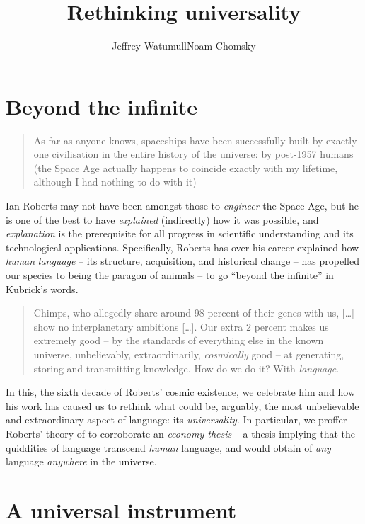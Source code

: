 \documentclass[output=paper]{langsci/langscibook}
\author{Jeffrey Watumull\affiliation{Oceanit}\lastand Noam Chomsky\affiliation{University of Arizona, Massachusetts Institute of Technology}}
\title{Rethinking universality}
\begin{document}
\glsresetall

\section{Beyond the infinite}%

\begin{quote}
As far as anyone knows, spaceships have been successfully built by exactly one
civilisation in the entire history of the universe: by post-1957 humans (the
Space Age actually happens to coincide exactly with my lifetime, although I had
nothing to do with it) \hfill \hbox{\citep[1]{Roberts2017}}
\end{quote}

Ian Roberts may not have been amongst those to \emph{engineer} the Space Age, but he is one of the best to
have \emph{explained} (indirectly) how it was possible, and \emph{explanation}
is the prerequisite for all progress in scientific understanding and its
technological applications. Specifically, Roberts has over his career explained
how \emph{human} \emph{language} -- its structure, acquisition, and historical
change -- has propelled our species to being the paragon of animals -- to go
\enquote{beyond the infinite} in Kubrick's words. \blockquote{Chimps, who
    allegedly share around 98 percent of their genes with us, […] show no
    interplanetary ambitions […]. Our extra 2 percent makes us extremely good -- by
    the standards of everything else in the known universe, unbelievably,
    extraordinarily, \emph{cosmically} good -- at generating, storing and
    transmitting knowledge. How do we do it? With \emph{language}.\\\hbox{}\hfill{\citep[1--2]{Roberts2017}}} 
In this, the sixth decade of Roberts’ cosmic
existence, we celebrate him and how his work has caused us to rethink what
could be, arguably, the most unbelievable and extraordinary aspect of language:
its \emph{universality}. In particular, we proffer Roberts’ theory of
 to corroborate an \emph{economy thesis} -- a thesis
    implying that the quiddities of language transcend \emph{human} language,
    and would obtain of \emph{any} language \emph{anywhere} in the universe.

\section{A universal instrument}
\end{document}
